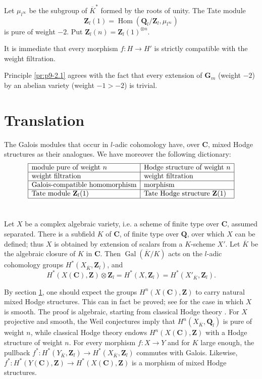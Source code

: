 \documentclass[11pt]{amsart}
\theoremstyle{plain}
\theoremstyle{definition}
\theoremstyle{remark}
\DeclareMathOperator{\Hom}{Hom}
\DeclareMathOperator{\Gal}{Gal}
\newcommand{\Q}{\mathbf{Q}}
\newcommand{\Z}{\mathbf{Z}}
\newcommand{\C}{\mathbf{C}}
\begin{document}
Let $\mu_{l^\infty}$ be the subgroup of $\overline K^*$ formed by the roots of unity. The Tate module
\[
\Z_l(1)=\Hom(\Q_l/\Z_l,\mu_{l^\infty})
\]
is pure of weight $-2$. Put $\Z_l(n)=\Z_l(1)^{\otimes n}$.

It is immediate that every morphism $f:H\to H'$ is strictly compatible with the weight filtration.

Principle \ref{pr:p9-2.1} agrees with the fact that every extension of $\mathbf G_m$ (weight $-2$) by an abelian variety (weight $-1>-2$) is trivial.

\section{Translation}\label{sec:p9-3}
The Galois modules that occur in $l$-adic cohomology have, over $\C$, mixed Hodge structures as their analogues. We have moreover the following dictionary:
\[
\begin{array}{|l|l|}
\hline
\text{module pure of weight } n & \text{Hodge structure of weight } n\\
\hline
\text{weight filtration} & \text{weight filtration}\\
\hline
\text{Galois-compatible homomorphism} & \text{morphism}\\
\hline
\text{Tate module }\Z_l(1)&\text{Tate Hodge structure }\Z(1)\\
\hline
\end{array}
\]

\section{}\label{sec:p9-4}
Let $X$ be a complex algebraic variety, i.e. a scheme of finite type over $\C$, assumed separated. There is a subfield $K$ of $\C$, of finite type over $\Q$, over which $X$ can be defined; thus $X$ is obtained by extension of scalars from a $K$-scheme $X'$. Let $\overline K$ be the algebraic closure of $K$ in $\C$. Then $\Gal(\overline K/K)$ acts on the $l$-adic cohomology groups $H^*(X_{\overline K},\Z_l)$, and
\[
H^*(X(\C),\Z)\otimes\Z_l=H^*(X,\Z_l)=H^*(X'_{\overline K},\Z_l).
\]

By section \ref{sec:p9-3}, one should expect the groups $H^n(X(\C),\Z)$ to carry natural mixed Hodge structures. This can in fact be proved; see \cite[3.2.5]{Hodge2} for the case in which $X$ is smooth. The proof is algebraic, starting from classical Hodge theory \cite{Weyl}. For $X$ projective and smooth, the Weil conjectures imply that $H^n(X_{\overline K},\Q_l)$ is pure of weight $n$, while classical Hodge theory endows $H^n(X(\C),\Z)$ with a Hodge structure of weight $n$. For every morphism $f:X\to Y$ and for $K$ large enough, the pullback $f^*:H^*(Y_{\overline K},\Z_l)\to H^*(X_{\overline K},\Z_l)$ commutes with Galois. Likewise, $f^*:H^*(Y(\C),\Z)\to H^*(X(\C),\Z)$ is a morphism of mixed Hodge structures.
\end{document}
